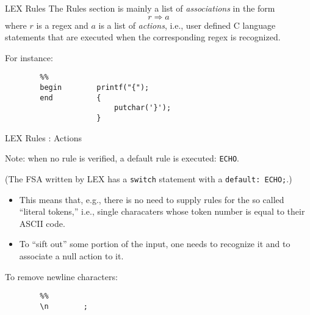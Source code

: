 \begin{frame}[fragile]{LEX Rules}
The Rules section is mainly a list of
{\em associations\/} in the form
        \[ r\Rightarrow a \]
where $r$ is a regex and $a$ is a list of {\em actions},
i.e., user defined C language statements that are executed
when the corresponding regex is recognized.


\vspace{20pt}

For instance:

\vspace{20pt}


\begin{verbatim}
        %%
        begin        printf("{");
        end          {
                         putchar('}');
                     }
\end{verbatim}




\end{frame}
\begin{frame}[fragile]{LEX Rules : Actions}

Note: when no rule is verified, a default rule is executed:
{\tt ECHO}.


\vspace{10pt}

\noindent
(The FSA written by LEX has a  {\tt switch} statement with a {\tt default: ECHO;}.)


\vspace{10pt}

\begin{itemize}
\item This means that, e.g., there is no need to supply rules for
the so called ``literal tokens,'' i.e., single characaters whose
token number is equal to their ASCII code.

\item
To ``sift out'' some portion of the input, one needs to recognize it
and to associate a null action to it.
\end{itemize}


\vspace{10pt}

To remove newline characters:
\begin{verbatim}
        %%
        \n        ;
\end{verbatim}
\end{frame}

